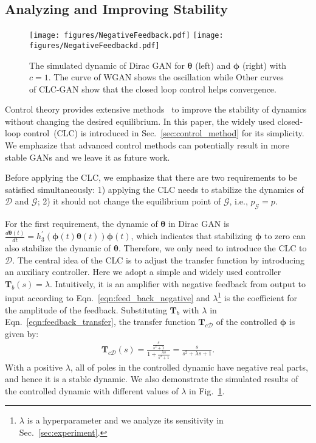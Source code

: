 \documentclass{article}
\newcommand{\xG}{\mathcal{G}}
\newcommand{\xD}{\mathcal{D}}
\newcommand{\ttheta}{\bm{\theta}}
\newcommand{\tphi}{\bm{\phi}}
\newcommand{\fT}{\bm{T}}
\newcommand{\fig}[1]{Fig.~\ref{fig:#1}}
\newcommand{\eqn}[1]{Eqn.~\eqref{eqn:#1}}
\newcommand{\secref}[1]{Sec.~\ref{sec:#1}} \usepackage{wrapfig}
\theoremstyle{definition}
\begin{document}
\subsection{Analyzing and Improving Stability}
\label{sec:ana_imp_stability}

\begin{figure}
	\centering
	\texttt{[image: figures/NegativeFeedback.pdf]}
	\texttt{[image: figures/NegativeFeedbackd.pdf]}
	\caption{The simulated dynamic of Dirac GAN for $\ttheta$ (left) and $\tphi$ (right) with $c=1$. The curve of WGAN shows the oscillation while Other curves of CLC-GAN show that the closed loop control helps convergence.}
	\label{fig:simulated_diracgan}
\end{figure}

Control theory provides extensive methods~\cite{khalil2002nonlinear} to improve the stability of dynamics without changing the desired equilibrium. In this paper, the widely used closed-loop control~(CLC) is introduced in \secref{control_method} for its simplicity. We emphasize that advanced control methods can potentially result in more stable GANs and we leave it as future work.

Before applying the CLC, we emphasize that there are two requirements to be satisfied simultaneously: 1) applying the CLC needs to stabilize the dynamics of $\xD$ and $\xG$; 2) it should not change the equilibrium point of $\xG$, i.e., $p_\xG = p$. 

For the first requirement, the dynamic of $\ttheta$ in Dirac GAN is $\frac{d\ttheta(t)}{dt} = h_3^\prime(\tphi(t) \ttheta(t))\tphi(t)$, which indicates that stabilizing $\tphi$ to zero can also stabilize the dynamic of $\ttheta$. Therefore, we only need to introduce the CLC to $\xD$.
The central idea of the CLC is to adjust the transfer function by introducing an auxiliary controller. Here we adopt a simple and widely used controller $\fT_b(s)=\lambda$. Intuitively, it is an amplifier with negative feedback from output to input according to \eqn{feed_back_negative} and $\lambda$\footnote{$\lambda$ is a hyperparameter and we analyze its sensitivity in \secref{experiment}.} is the coefficient for the amplitude of the feedback.
Substituting $\fT_b$ with $\lambda$ in \eqn{feedback_transfer}, the transfer function $\fT_{c\xD}$ of the controlled $\tphi$ is given by:
\begin{align}
\fT_{c\xD}(s) = \frac{\frac{s}{s^2+1}}{1 + \frac{\lambda s}{s^2 + 1}} = \frac{s}{s^2 + \lambda s + 1}.
\end{align}
With a positive $\lambda$, all of poles in the controlled dynamic have negative real parts, and hence it is a stable dynamic. We also demonstrate the simulated results of the controlled dynamic with different values of $\lambda$ in \fig{simulated_diracgan}.
\end{document}

